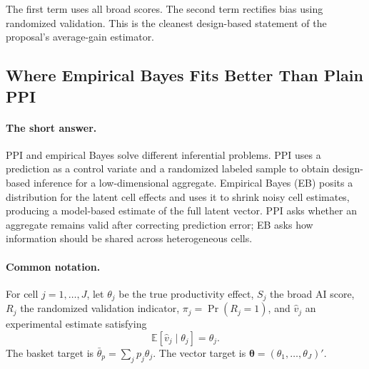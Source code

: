 \documentclass[11pt]{article}
\newcommand{\E}{\mathbb{E}}
\newcommand{\thetav}{\boldsymbol{\theta}}
\begin{document}
The first term uses all broad scores. The second term rectifies bias using randomized validation. This is the cleanest design-based statement of the proposal's average-gain estimator.

\subsection{Where Empirical Bayes Fits Better Than Plain PPI}

\paragraph{The short answer.}
PPI and empirical Bayes solve different inferential problems.  PPI uses a
prediction as a control variate and a randomized labeled sample to obtain
design-based inference for a low-dimensional aggregate.  Empirical Bayes (EB)
posits a distribution for the latent cell effects and uses it to shrink noisy
cell estimates, producing a model-based estimate of the full latent vector.
PPI asks whether an aggregate remains valid after correcting prediction error;
EB asks how information should be shared across heterogeneous cells.

\paragraph{Common notation.}
For cell \(j=1,\ldots,J\), let \(\theta_j\) be the true productivity effect,
\(S_j\) the broad AI score, \(R_j\) the randomized validation indicator,
\(\pi_j=\Pr(R_j=1)\), and \(\widehat v_j\) an experimental estimate satisfying
\[
\E[\widehat v_j\mid\theta_j]=\theta_j.
\tag{validation-unbiasedness}
\]
The basket target is \(\bar\theta_p=\sum_jp_j\theta_j\).  The vector target is
\(\thetav=(\theta_1,\ldots,\theta_J)'\).
\end{document}

